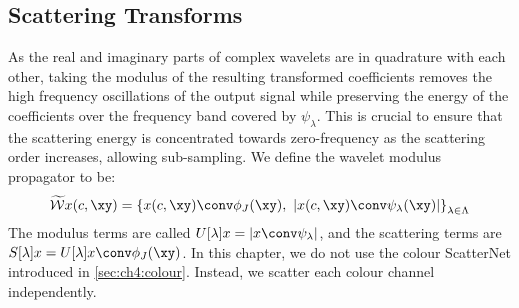 \subsection{Scattering Transforms}\label{sec:ch5:scatter}
As the real and imaginary parts of complex wavelets are in quadrature with
each other, taking the modulus of the resulting transformed coefficients removes
the high frequency oscillations of the output signal while preserving the energy
of the coefficients over the frequency band covered by $\psi_\lambda$. This is
crucial to ensure that the scattering energy is concentrated towards
zero-frequency as the scattering order increases, allowing sub-sampling.
We define the wavelet modulus propagator to be:
%
\begin{equation}
  \label{eq:ch5:wave_mod}
\widetilde{\mathcal{W}}x(c, \xy) = \left\{ x(c, \xy) \conv \phi_{J}(\xy),\ |x(c, \xy) \conv \psi_\lambda (\xy) | \right\}_{\lambda \in \Lambda} 
\end{equation}
The modulus terms are called $U[\lambda] x = \lvert x \conv \psi_\lambda \rvert$, and the scattering terms
are $S[\lambda] x = U[\lambda]x \conv \phi_J (\xy)$. In this chapter, we do not
use the colour ScatterNet introduced in \autoref{sec:ch4:colour}. Instead, we scatter each
colour channel independently.
